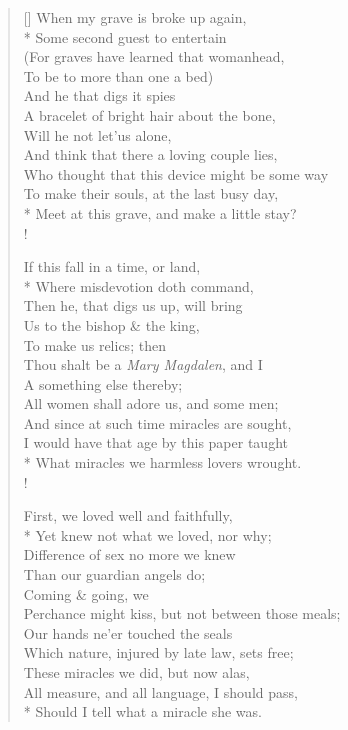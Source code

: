 \documentclass[MAIN]{subfiles}
\begin{document}
\settowidth{\versewidth}{Who thought that this device might be some way}
\begin{verse}[\versewidth]
\vin When my grave is broke up again,\\*
\vin Some second guest to entertain\\
\vin (For graves have learned that womanhead,\\
\vin To be to more than one a bed)\\
\vin \vin And he that digs it spies\\
A bracelet of bright hair about the bone,\\
\vin \vin Will he not let'us alone,\\
And think that there a loving couple lies,\\
Who thought that this device might be some way\\
To make their souls, at the last busy day,\\*
Meet at this grave, and make a little stay?\\!

\vin If this fall in a time, or land,\\*
\vin Where misdevotion doth command,\\
\vin Then he, that digs us up, will bring\\
\vin Us to the bishop \& the king,\\
\vin \vin To make us relics; then\\
Thou shalt be a \emph{Mary Magdalen}, and I\\
\vin \vin A something else thereby;\\
All women shall adore us, and some men;\\
And since at such time miracles are sought,\\
I would have that age by this paper taught\\*
What miracles we harmless lovers wrought.\\!

\vin First, we loved well and faithfully,\\*
\vin Yet knew not what we loved, nor why;\\
\vin Difference of sex no more we knew\\
\vin Than our guardian angels do;\\
\vin \vin Coming \& going, we\\
Perchance might kiss, but not between those meals;\\
\vin \vin Our hands ne'er touched the seals\\
Which nature, injured by late law, sets free;\\
These miracles we did, but now alas,\\
All measure, and all language, I should pass,\\*
Should I tell what a miracle she was.
\end{verse}
\end{document}
